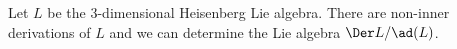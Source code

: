 Let $L$ be the $3$-dimensional Heisenberg Lie algebra. There are non-inner
derivations of $L$ and we can determine the Lie algebra $\Der L/\ad(L)$.

